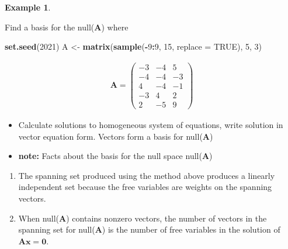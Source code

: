 \documentclass[
]{book}
\newenvironment{Shaded}{\begin{snugshade}}{\end{snugshade}}
\newcommand{\DataTypeTok}[1]{\textcolor[rgb]{0.13,0.29,0.53}{#1}}
\newcommand{\DecValTok}[1]{\textcolor[rgb]{0.00,0.00,0.81}{#1}}
\newcommand{\KeywordTok}[1]{\textcolor[rgb]{0.13,0.29,0.53}{\textbf{#1}}}
\newcommand{\NormalTok}[1]{#1}
\newcommand{\OperatorTok}[1]{\textcolor[rgb]{0.81,0.36,0.00}{\textbf{#1}}}
\newcommand{\OtherTok}[1]{\textcolor[rgb]{0.56,0.35,0.01}{#1}}
\newcommand{\StringTok}[1]{\textcolor[rgb]{0.31,0.60,0.02}{#1}}
\providecommand{\tightlist}{%
  \setlength{\itemsep}{0pt}\setlength{\parskip}{0pt}}
\theoremstyle{definition}
\theoremstyle{definition}
\newtheorem{example}{Example}[chapter]
\theoremstyle{definition}
\theoremstyle{remark}
\begin{document}
\begin{example}
\protect\hypertarget{exm:unlabeled-div-131}{}\label{exm:unlabeled-div-131}

Find a basis for the null(\(\mathbf{A}\)) where

\begin{Shaded}
\begin{Highlighting}[]
\KeywordTok{set.seed}\NormalTok{(}\DecValTok{2021}\NormalTok{)}
\NormalTok{A <-}\StringTok{ }\KeywordTok{matrix}\NormalTok{(}\KeywordTok{sample}\NormalTok{(}\OperatorTok{-}\DecValTok{9}\OperatorTok{:}\DecValTok{9}\NormalTok{, }\DecValTok{15}\NormalTok{, }\DataTypeTok{replace =} \OtherTok{TRUE}\NormalTok{), }\DecValTok{5}\NormalTok{, }\DecValTok{3}\NormalTok{)}
\end{Highlighting}
\end{Shaded}

\[
\begin{aligned}
\mathbf{A} = \begin{pmatrix} -3 & -4 & 5 \\ -4 & -4 & -3 \\ 4 & -4 & -1 \\ -3 & 4 & 2 \\ 2 & -5 & 9 \end{pmatrix}
\end{aligned}
\]

\begin{itemize}
\tightlist
\item
  Calculate solutions to homogeneous system of equations, write solution in vector equation form. Vectors form a basis for null(\(\mathbf{A}\))
\end{itemize}

\end{example}

\begin{itemize}
\tightlist
\item
  \textbf{note:} Facts about the basis for the null space null(\(\mathbf{A}\))
\end{itemize}

\begin{enumerate}
\def\labelenumi{\arabic{enumi})}
\item
  The spanning set produced using the method above produces a linearly independent set because the free variables are weights on the spanning vectors.
\item
  When null(\(\mathbf{A}\)) contains nonzero vectors, the number of vectors in the spanning set for null(\(\mathbf{A}\)) is the number of free variables in the solution of \(\mathbf{A} \mathbf{x} = \mathbf{0}\).
\end{enumerate}
\end{document}
